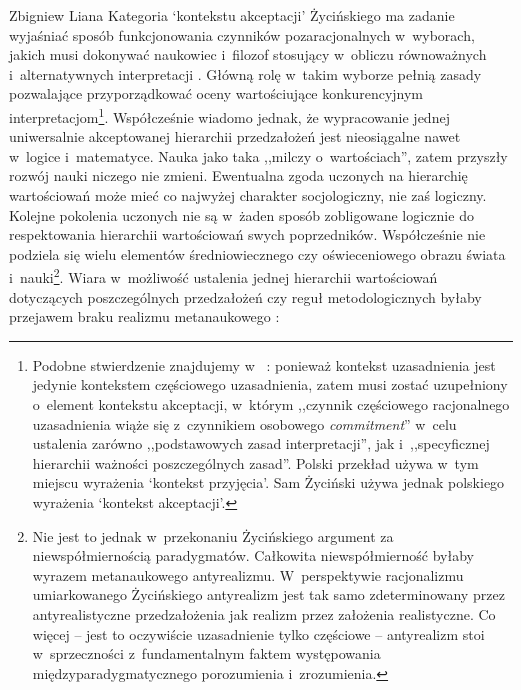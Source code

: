 \begin{artplenv}{Zbigniew Liana}
Kategoria ‘kontekstu akceptacji' Życińskiego ma zadanie wyjaśniać sposób funkcjonowania czynników pozaracjonalnych w~wyborach, jakich musi dokonywać naukowiec i~filozof stosujący w~obliczu równoważnych i~alternatywnych interpretacji
\parencite[][s.~225nn]{zycinski_teizm_1985}. %
 Główną rolę w~takim wyborze pełnią zasady pozwalające przyporządkować oceny wartościujące konkurencyjnym interpretacjom\footnote{Podobne stwierdzenie znajdujemy w~%
\parencites[][s.~137]{zycinski_structure_1988}[][s.~242n]{zycinski_struktura_2013_liana}: %
 ponieważ kontekst uzasadnienia jest jedynie kontekstem częściowego uzasadnienia, zatem musi zostać uzupełniony o~element kontekstu akceptacji, w~którym ,,czynnik częściowego racjonalnego uzasadnienia wiąże się z~czynnikiem osobowego \textit{commitment}'' w~celu ustalenia zarówno ,,podstawowych zasad interpretacji'', jak i~,,specyficznej hierarchii ważności poszczególnych zasad''. Polski przekład 
\parencite[][s.~243]{zycinski_struktura_2013_liana} %
 używa w~tym miejscu wyrażenia ‘kontekst przyjęcia'. Sam Życiński używa jednak polskiego wyrażenia ‘kontekst akceptacji'.}. Współcześnie wiadomo jednak, że wypracowanie jednej uniwersalnie akceptowanej hierarchii przedzałożeń jest nieosiągalne nawet w~logice i~matematyce. Nauka jako taka ,,milczy o~wartościach'', zatem przyszły rozwój nauki niczego nie zmieni. Ewentualna zgoda uczonych na hierarchię wartościowań może mieć co najwyżej charakter socjologiczny, nie zaś logiczny. Kolejne pokolenia uczonych nie są w~żaden sposób zobligowane logicznie do respektowania hierarchii wartościowań swych poprzedników. Współcześnie nie podziela się wielu elementów średniowiecznego czy oświeceniowego obrazu świata i~nauki\footnote{Nie jest to jednak w~przekonaniu Życińskiego argument za niewspółmiernością paradygmatów. Całkowita niewspółmierność byłaby wyrazem metanaukowego antyrealizmu. W~perspektywie racjonalizmu umiarkowanego Życińskiego antyrealizm jest tak samo zdeterminowany przez antyrealistyczne przedzałożenia jak realizm przez założenia realistyczne. Co więcej -- jest to oczywiście uzasadnienie tylko częściowe -- antyrealizm stoi w~sprzeczności z~fundamentalnym faktem występowania międzyparadygmatycznego porozumienia i~zrozumienia.}. Wiara w~możliwość ustalenia jednej hierarchii wartościowań dotyczących poszczególnych przedzałożeń czy reguł metodologicznych byłaby przejawem braku realizmu metanaukowego :


\end{artplenv}
